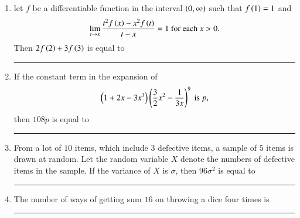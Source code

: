 \documentclass[journal]{IEEEtran}
\numberwithin{equation}{enumi}
\numberwithin{figure}{enumi}
\begin{document}
\begin{enumerate}
    \hfill{}

    \item 
    let $f$ be a differentiable function in the interval $\left(0, \infty\right)$ such that $f\left(1\right) = 1$ and 
    \begin{align*}
        \lim_{t \to x} \frac{t^2f\left(x\right) - x^2f\left(t\right)}{t - x} = 1 \text{ for each } x > 0.
    \end{align*}
    Then $2f\left(2\right) + 3f\left(3\right)$ is equal to \rule{1cm}{0.1pt}

    \hfill{}

    \item 
    If the constant term in the expansion of 
    \begin{align*}
        \left(1 + 2x - 3x^3\right)\left(\frac{3}{2}x^2 - \frac{1}{3x}\right)^9 \text{ is } p,
    \end{align*}
    then $108p$ is equal to \rule{1cm}{0.1pt}

    \hfill{}

    \item 
    From a lot of $10$ items, which include $3$ defective items, a sample of $5$ items is drawn at random. Let the random variable $X$ denote the numbers of defective items in the sample. If the variance of $X$ is $\sigma$, then $96\sigma^2$ is equal to \rule{1cm}{0.1pt}

    \hfill{}

    \item 
    The number of ways of getting sum $16$ on throwing a dice four times is \rule{1cm}{0.1pt}

    \hfill{}

\end{enumerate}
\end{document}
